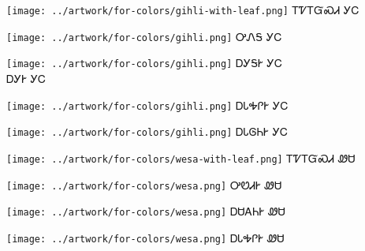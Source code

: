 \documentclass[avery5371]{flashcards}%
\begin{document}

\begin{flashcard}{
\texttt{[image: ../artwork/for-colors/gihli-with-leaf.png]}
}\Huge ᎢᏤᎢᏳᏍᏗ ᎩᏟ
\end{flashcard}

\begin{flashcard}{
\texttt{[image: ../artwork/for-colors/gihli.png]}
}\Huge ᎤᏁᎦ ᎩᏟ
\end{flashcard}

\begin{flashcard}{
\texttt{[image: ../artwork/for-colors/gihli.png]}
}\Huge ᎠᎩᎦᎨ ᎩᏟ\\ᎠᎩᎨ ᎩᏟ
\end{flashcard}

\begin{flashcard}{
\texttt{[image: ../artwork/for-colors/gihli.png]}
}\Huge ᎠᏓᎭᎵᎨ ᎩᏟ
\end{flashcard}

\begin{flashcard}{
\texttt{[image: ../artwork/for-colors/gihli.png]}
}\Huge ᎠᏓᎶᏂᎨ ᎩᏟ
\end{flashcard}

\begin{flashcard}{
\texttt{[image: ../artwork/for-colors/wesa-with-leaf.png]}
}\Huge ᎢᏤᎢᏳᏍᏗ ᏪᏌ
\end{flashcard}

\begin{flashcard}{
\texttt{[image: ../artwork/for-colors/wesa.png]}
}\Huge ᎤᏬᏗᎨ ᏪᏌ
\end{flashcard}

\begin{flashcard}{
\texttt{[image: ../artwork/for-colors/wesa.png]}
}\Huge ᎠᏌᎪᏂᎨ ᏪᏌ
\end{flashcard}

\begin{flashcard}{
\texttt{[image: ../artwork/for-colors/wesa.png]}
}\Huge ᎠᏓᎭᎵᎨ ᏪᏌ
\end{flashcard}
\end{document}
